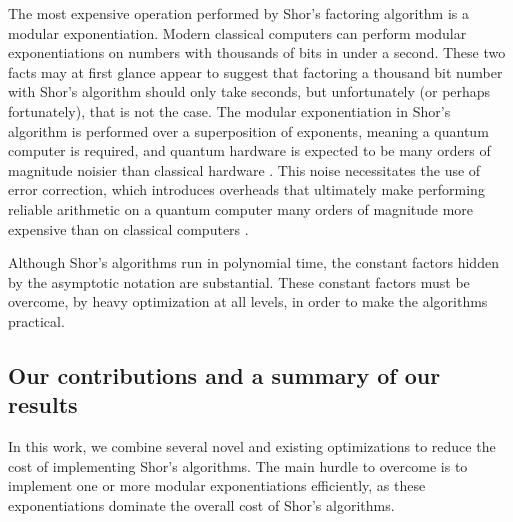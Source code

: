 \documentclass[superscriptaddress,notitlepage,longbibliography]{revtex4-1}
\theoremstyle{definition}
\theoremstyle{definition}
\begin{document}
The most expensive operation performed by Shor's factoring algorithm is a modular exponentiation.
Modern classical computers can perform modular exponentiations on numbers with thousands of bits in under a second.
These two facts may at first glance appear to suggest that factoring a thousand bit number with Shor's algorithm should only take seconds, but unfortunately (or perhaps fortunately), that is not the case.
The modular exponentiation in Shor's algorithm is performed over a superposition of exponents, meaning a quantum computer is required, and quantum hardware is expected to be many orders of magnitude noisier than classical hardware \cite{schroeder2009dram,Bare13,Kim2014}.
This noise necessitates the use of error correction, which introduces overheads that ultimately make performing reliable arithmetic on a quantum computer many orders of magnitude more expensive than on classical computers \cite{fowler2012surfacecodereview, campbell2018constraintsatisfaction}.

Although Shor's algorithms run in polynomial time, the constant factors hidden by the asymptotic notation are substantial.
These constant factors must be overcome, by heavy optimization at all levels, in order to make the algorithms practical.

\subsection{Our contributions and a summary of our results}

In this work, we combine several novel and existing optimizations to reduce the cost of implementing Shor's algorithms.
The main hurdle to overcome is to implement one or more modular exponentiations efficiently, as these exponentiations dominate the overall cost of Shor's algorithms.
\end{document}
